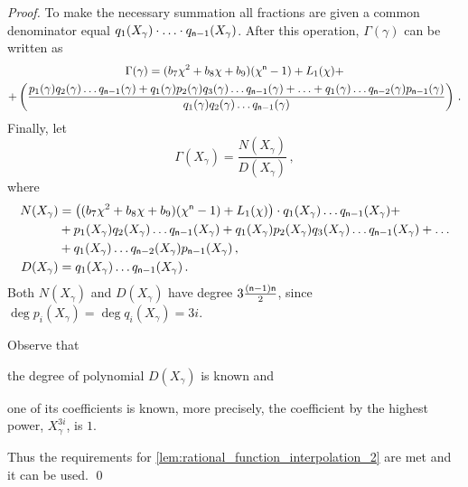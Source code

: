 \documentclass[runningheads]{llncs}
\theoremstyle{definition}
\begin{document}
\begin{proof}
To make the necessary summation all fractions are given a common denominator equal $q_1 (X_\gamma) \cdot \ldots \cdot q_{\mathsf{n} - 1} (X_\gamma)$. After this operation, $\Gamma(\gamma)$ can be written as
\begin{multline}
  \Gamma(\gamma) = (b_7 \chi^2 + b_8 \chi + b_9) (\chi^{\mathsf{n}} - 1) + L_1 (\chi) + \\
   + \left(\frac{
   p_1(\gamma) q_2(\gamma) \ldots q_{\mathsf{n} - 1}(\gamma) + q_1(\gamma) p_2(\gamma) q_3(\gamma) \ldots q_{\mathsf{n} - 1}(\gamma) + \ldots + q_1(\gamma) \ldots q_{\mathsf{n} - 2}(\gamma) p_{\mathsf{n} - 1}(\gamma)
   }{
   q_1(\gamma) q_2(\gamma) \ldots q_{\mathsf{n} - 1}(\gamma)
   }
  \right)\,.
\end{multline}
Finally, let 
\[
  \Gamma (X_\gamma) = \frac{N(X_\gamma)}{D(X_\gamma)}\,,
\]
where 
\begin{align*}
  N(X_\gamma) & = \left((b_7 \chi^2 + b_8 \chi + b_9) (\chi^{\mathsf{n}} - 1) + L_1 (\chi)\right) \cdot q_1(X_\gamma) \ldots q_{\mathsf{n} - 1}(X_\gamma) + \\
   & + p_1(X_\gamma) q_2(X_\gamma) \ldots q_{\mathsf{n} - 1}(X_\gamma) + q_1(X_\gamma) p_2(X_\gamma) q_3(X_\gamma) \ldots q_{\mathsf{n} - 1}(X_\gamma) + \ldots \\
   & + q_1(X_\gamma) \ldots q_{\mathsf{n} - 2}(X_\gamma) p_{\mathsf{n} - 1}(X_\gamma)\,,\\
  D(X_\gamma) & = q_1(X_\gamma)  \ldots q_{\mathsf{n} - 1}(X_\gamma)\,.
\end{align*} 
Both $N(X_\gamma)$ and $D(X_\gamma)$ have degree $3 \frac{(\mathsf{n} - 1) \mathsf{n}}{2}$, since $\deg p_i (X_\gamma) \allowbreak = \deg q_i (X_\gamma) = 3 i$.

Observe that 
\begin{inparaenum}[(i)]
	\item the degree of polynomial $D(X_\gamma)$ is known and 
	\item one of its coefficients is known, more precisely, the coefficient by the highest power, $X_\gamma^{3i}$, is $1$.
\end{inparaenum}
 Thus the requirements for \cref{lem:rational_function_interpolation_2} are met and it can be used. 
\qed
\end{proof}



\end{document}
